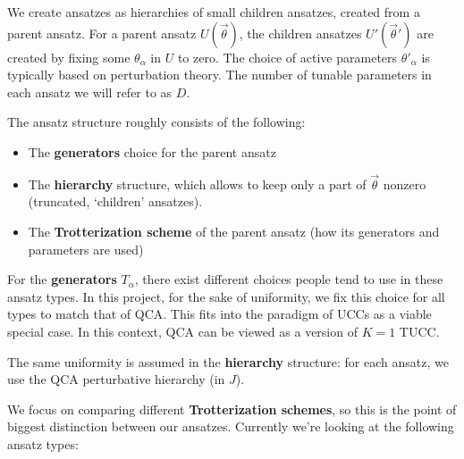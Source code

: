 \documentclass[10pt, a4paper]{article}
\begin{document}
We create ansatzes as hierarchies of small children ansatzes, created from a parent ansatz. For a parent ansatz $U(\vec{\theta})$, the children ansatzes $U'(\vec{\theta}')$ are created by fixing some $\theta_{\alpha}$ in $U$ to zero. The choice of active parameters $\theta'_\alpha$ is typically based on perturbation theory. The number of tunable parameters in each ansatz we will refer to as $D$.

The ansatz structure roughly consists of the following:

\begin{itemize}
\item The \textbf{generators} choice for the parent ansatz
\item The \textbf{hierarchy} structure, which allows to keep only a part of $\vec{\theta}$ nonzero (truncated, `children' ansatzes).
\item The \textbf{Trotterization scheme} of the parent ansatz (how its generators and parameters are used)
\end{itemize}

For the \textbf{generators} $T_{\alpha}$, there exist different choices people tend to use in these ansatz types. In this project, for the sake of uniformity, we fix this choice for all types to match that of QCA. This fits into the paradigm of UCCs as a viable special case. In this context, QCA can be viewed as a version of $K=1$ TUCC.

The same uniformity is assumed in the \textbf{hierarchy} structure: for each ansatz, we use the QCA perturbative hierarchy (in $J$).

We focus on comparing different \textbf{Trotterization schemes}, so this is the point of biggest distinction between our ansatzes. Currently we're looking at the following ansatz types:
\end{document}
